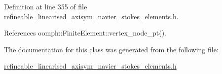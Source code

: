 Definition at line 355 of file refineable\+\_\+linearised\+\_\+axisym\+\_\+navier\+\_\+stokes\+\_\+elements.\+h.



References oomph\+::\+Finite\+Element\+::vertex\+\_\+node\+\_\+pt().



The documentation for this class was generated from the following file\+:\begin{DoxyCompactItemize}
\item 
\hyperlink{refineable__linearised__axisym__navier__stokes__elements_8h}{refineable\+\_\+linearised\+\_\+axisym\+\_\+navier\+\_\+stokes\+\_\+elements.\+h}\end{DoxyCompactItemize}
